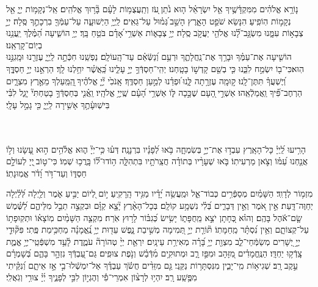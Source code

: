 \documentclass[twoside, openany, parskip=half, 11pt]{book}
\begin{document}
נ֤וֹרָ֥א אֱלֹהִ֗ים מִמִּקְדָּ֫שֶׁ֥יךָ אֵ֤ל יִשְׂרָאֵ֗ל ה֤וּא נֹ֙תֵן ֖עֹז וְתַֽעֲצֻמ֥וֹת לָעָ֗ם בָּ֘ר֥וּךְ אֱלֹהִֽים׃
אֵֽל־נְקָמ֥וֹת
 יְיָ֑ אֵ֖ל נְקָמ֣וֹת הֽוֹפִֽיעַ׃
הִנָּשֵׂא שֹׁפֵ֣ט הָאָ֑רֶץ הָשֵׁ֣ב ֝גְּמ֗וּל עַל־גֵּאִֽים׃
לַֽיְיָ֥
 הַיְשׁוּעָ֑ה עַל־עַמְּֿךָ֖ בִרְכָתֶ֣ךָ סֶּֽלָה׃
יְיָ֣
 צְבָא֣וֹת עִמָּ֑נוּ מִשְׂגָּ֥ב־לָ֝֗נוּ אֱלֹהֵ֖י יַעֲקֹ֣ב סֶֽלָה׃
יְיָ֥
 צְבָא֑וֹת אַשְׁרֵ֥י ֝אָדָ֗ם בֹּטֵ֥חַ בָּֽךְ׃
יְיָ֥
 הוֹשִׁ֑יעָה הַ֝מֶּ֗לֶךְ יַֽעֲנֵ֥נוּ בְיֽוֹם־קָרְאֵֽנוּ׃\\
הוֹשִׁ֤יעָה
 אֶת־עַמֶּ֗ךָ וּבָרֵ֥ךְ אֶת־נַֽחֲלָתֶ֑ךָ וּרְעֵ֥ם וְ֝נַשְּֿׂאֵ֗ם עַד־הָֽעוֹלָֽם׃
נַפְשֵֽׁנוּ
 חִכְּֿתָ֣ה לַֽיְיָ֑ עֶזְרֵ֖נוּ וּמָֽגִנֵּ֣נוּ הֽוּא׃כִּי־ב֖וֹ יִשְׂמַ֣ח לִבֵּ֑נוּ כִּ֤י בְשֵׁ֖ם קָדְשׁ֣וֹ בָטָֽחְנוּ׃ יְהִֽי־חַסְדְּֿךָ֣ יְיָ֣ עָלֵ֑ינוּ כַּֽ֝אֲשֶׁ֗ר יִחַ֥לְנוּ לָֽךְ׃
הַרְאֵ֣נוּ
 יְיָ֣ חַסְדֶֶּ֑ךָ וְ֝יֶשְׁעֲךָ֗ תִּתֶּן־לָֽנוּ׃
ק֣וּמָֽה
 עֶזְרָ֥תָה לָּ֑נוּ ֜וּפְדֵ֗נוּ לְמַ֣עַן חַסְדֶּֽךָ׃
 אָֽנֹכִ֙י
  יְ֘יָ֤ אֱלֹהֶ֗יךָ ֖הַֽמַּֽעַלְךָ מֵאֶ֣רֶץ מִצְרָ֑יִם הַרְחֶב־פִּ֝֗יךָ וַֽאֲמַלְֿאֵֽהוּ׃
אַשְׁרֵ֣י ֖הָעָם
 שֶׁכָּ֣כָה לּ֑וֹ אַשְׁרֵ֥י הָ֝עָ֗ם שֶֽׁיְיָ֥ אֱלֹהָֽיו׃
וַֽאֲ֗נִ֤י
 בְּחַסְדְּֿךָ֣ בָטַחְתִּי֘ יָגֵ֢ל לִבִּ֗י בִּישֽׁוּעָ֫תֶ֥ךָ אָשִׁ֥ירָה לַֽיְיָ֑ כִּ֖י גָמַ֣ל עָלָֽי׃

\\
\\
 
 הָרִ֥יעוּ לַֽ֝יְיָ֗ כָּל־הָאָֽרֶץ
עִבְד֣וּ אֶת־יְיָ֣ בְּשִׂמְחָ֑ה בֹּ֥אוּ לְ֝פָנָ֗יו בִּרְנָנָֽה׃
דְּע֗וּ כִּ֥י־יְיָ֘ ה֢וּא אֱלֹ֫הִ֥ים ה֣וּא עָ֭שָׂנוּ וְל֣וֹ אֲנַ֤חְנוּ עַ֝מּ֗וֹ וְצֹ֣אן מַרְעִיתֽוֹ׃
בֹּ֤אוּ שְׁעָרָ֨יו בְּתוֹדָ֗ה חֲצֵֽרֹתָ֥יו בִּתְהִלָּ֑ה ה֥וֹדוּ־ל֝֗וֹ בָּֽרֲכ֥וּ שְׁמֽוֹ׃
 כִּי־ט֣וֹב ֖יְיָ לְעוֹלָ֣ם חַסְדּ֑וֹ וְעַד־דֹּ֥ר וָ֝דֹ֗ר אֱמֽוּנָתֽוֹ׃

 \pageref{yehikvod}

\sepline

 מִזְמ֥וֹר לְדָוִֽד׃
הַשָּׁמַ֗יִם מְסַפְּֿרִ֥ים כְּבוֹד־אֵ֑ל וּמַֽעֲשֵׂ֥ה יָ֝דָ֗יו מַגִּ֥יד הָֽרָקִֽיעַ׃
י֣וֹם לְ֭יוֹם יַבִּ֣יעַ אֹ֑מֶר וְלַ֥יְלָה לְּ֝לַ֗יְלָה יְחַוֶּה־דָּֽעַת׃
אֵ֣ין אֹ֭מֶר וְאֵ֣ין דְּבָרִ֑ים בְּ֝לִ֗י נִשְׁמָ֥ע קוֹלָֽם׃
בְּכָל־הָאָ֨רֶץ יָ֘צָ֤א קַוָּ֗ם וּבִקְצֵ֣ה תֵבֵ֣ל מִלֵּיהֶ֑ם לַ֝שֶּׁ֗מֶשׁ שָׂ֤ם־אֹ֬הֶל בָּהֶֽם׃
וְהוּ֗א כְּ֭חָתָן יֹצֵ֣א מֵֽחֻפָּת֑וֹ יָשִׂ֥ישׂ כְּ֝גִבּ֗וֹר לָר֥וּץ אֹֽרַח׃
מִקְצֵ֤ה הַשָּׁמַ֨יִם מֽוֹצָא֗וֹ וּתְקֽוּפָת֥וֹ עַל־קְצוֹתָ֑ם וְאֵ֥ין נִ֝סְתָּ֗ר מֵֽחַמָּתֽוֹ׃
תּ֘וֹרַ֤ת יְיָ֣ תְּ֭מִימָה מְשִׁ֣יבַת נָ֑פֶשׁ עֵד֖וּת יְיָ֥ נֶֽ֝אֱמָנָ֗ה מַחְכִּ֥ימַת פֶּֽתִי׃
פִּקּ֘וּדֵ֤י יְיָ֣ יְ֭שָׁרִים מְשַׂמְּֿחֵי־לֵ֑ב מִצְוַ֖ת יְיָ֥ בָּ֝רָ֗ה מְאִירַ֥ת עֵינָֽיִם׃
יִרְאַ֤ת יְיָ֨ טְהוֹרָה֘ עֹמֶ֢דֶת לָ֫עַ֥ד מִשְׁפְּֿטֵֽי־יְיָ֥ אֱמֶ֑ת צָֽדְֿק֥וּ יַחְדָּֽו׃
הַנֶּֽחֱמָדִ֗ים מִ֭זָּהָב וּמִפַּ֣ז רָ֑ב וּמְתוּקִ֥ים מִ֜דְּֿבַ֗שׁ וְנֹ֣פֶת צוּפִֽים׃
גַּם־עַ֭בְדְּֿךָ נִזְהָ֣ר בָּהֶ֑ם בְּ֝שָׁמְרָ֗ם עֵ֣קֶב רָֽב׃
שְׁגִיא֥וֹת מִֽי־יָבִ֑ין מִנִּסְתָּר֥וֹת נַקֵּֽנִי׃
גַּ֤ם מִזֵּדִ֨ים חֲשֹׂ֬ךְ עַבְדֶּ֗ךָ אַל־יִמְשְֿׁלוּ־בִ֣י אָ֣ז אֵיתָ֑ם וְ֝נִקֵּ֗יתִי מִפֶּ֥שַֽׁע רָֽב׃
יִהְי֥וּ לְרָצ֨וֹן אִמְרֵי־פִ֡י וְהֶגְי֣וֹן לִבִּ֣י לְפָנֶ֑יךָ יְ֜יָ֗ צוּרִ֥י וְגֹֽאֲלִֽי׃
\end{document}
